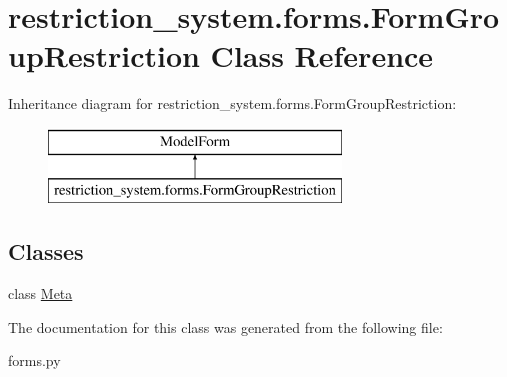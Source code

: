 \hypertarget{classrestriction__system_1_1forms_1_1FormGroupRestriction}{}\section{restriction\+\_\+system.\+forms.\+Form\+Group\+Restriction Class Reference}
\label{classrestriction__system_1_1forms_1_1FormGroupRestriction}
Inheritance diagram for restriction\+\_\+system.\+forms.\+Form\+Group\+Restriction\+:\begin{figure}[H]
\begin{center}
\leavevmode
\includegraphics[height=2.000000cm]{classrestriction__system_1_1forms_1_1FormGroupRestriction}
\end{center}
\end{figure}
\subsection*{Classes}
\begin{DoxyCompactItemize}
\item 
class \hyperlink{classrestriction__system_1_1forms_1_1FormGroupRestriction_1_1Meta}{Meta}
\end{DoxyCompactItemize}


The documentation for this class was generated from the following file\+:\begin{DoxyCompactItemize}
\item 
forms.\+py\end{DoxyCompactItemize}
